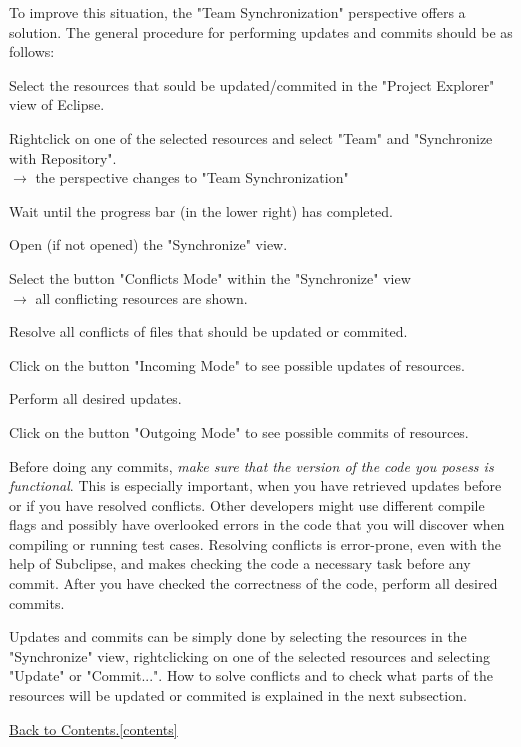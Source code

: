 \documentclass[11pt, oneside]{scrartcl}
\newcommand{\backtocontents}{\hyperref[contents]{Back to Contents.\ref*{contents}}}
\begin{document}
To improve this situation, the "Team Synchronization" perspective offers a
solution. The general procedure for performing updates and commits should be as
follows:
\begin{enumerate*}
\item Select the resources that sould be updated/commited in the "Project
Explorer" view of Eclipse.
\item Rightclick on one of the selected resources and select "Team" and
"Synchronize with Repository". \\ $\rightarrow$ the perspective changes to
"Team Synchronization"
\item Wait until the progress bar (in the lower right) has completed.
\item Open (if not opened) the "Synchronize" view.
\item Select the button "Conflicts Mode" within the "Synchronize" view \\
$\rightarrow$ all conflicting resources are shown.
\item Resolve all conflicts of files that should be updated or commited.
\item Click on the button "Incoming Mode" to see possible updates of resources.
\item Perform all desired updates.
\item Click on the button "Outgoing Mode" to see possible commits of resources.
\item Before doing any commits, \textit{make sure that the version of the code
you posess is functional}. This is especially important, when you have
retrieved updates before or if you have resolved conflicts. Other developers
might use different compile flags and possibly have overlooked errors in the
code that you will discover when compiling or running test cases. Resolving
conflicts is error-prone, even with the help of Subclipse, and makes checking
the code a necessary task before any commit. After you have checked the
correctness of the code, perform all desired commits.
\end{enumerate*}
Updates and commits can be simply done by selecting the resources in the
"Synchronize" view, rightclicking on one of the selected resources and
selecting "Update" or "Commit...". How to solve conflicts and to check what
parts of the resources will be updated or commited is explained in the next
subsection.

\backtocontents

\end{document}
